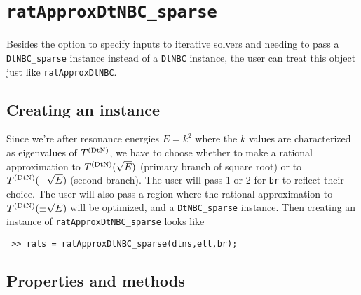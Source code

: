 \section{{\tt ratApproxDtNBC\_sparse}}
\label{sec-ratApproxDtNBC_sparse}

Besides the option to specify inputs to iterative solvers and needing to
pass a {\tt DtNBC\_sparse} instance instead of a {\tt DtNBC} instance, the user
can treat this object just like {\tt ratApproxDtNBC}.

\subsection{Creating an instance}

Since we're after resonance energies $E = k^2$ where the $k$ values are
characterized as eigenvalues of $T^{(\text{DtN})}$, we have to choose whether to
make a rational approximation to $T^{(\text{DtN})}(\sqrt{E})$ (primary branch of
square root) or to $T^{(\text{DtN})}(-\sqrt{E})$ (second branch). The user will pass
1 or 2 for {\tt br} to reflect their choice. The user will also pass
a region where the rational approximation to $T^{(\text{DtN})}(\pm\sqrt{E})$
will be optimized, and a {\tt DtNBC\_sparse} instance. Then creating
an instance of {\tt ratApproxDtNBC\_sparse} looks like
\begin{verbatim}
 >> rats = ratApproxDtNBC_sparse(dtns,ell,br);
\end{verbatim}

\subsection{Properties and methods}

